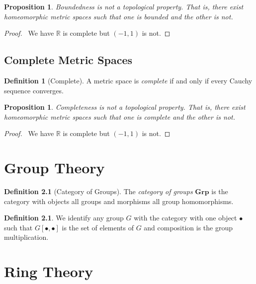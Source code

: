 \documentclass{book}
\let\qed\relax
\newtheorem{proposition}[lemma]{Proposition}
\theoremstyle{definition}
\newtheorem{definition}[lemma]{Definition}
\newcommand{\Real}{\ensuremath{\mathbb{R}}}
\begin{document}
\begin{proposition}
    Boundedness is not a topological property. That is, there exist homeomorphic metric spaces such that one is bounded and the other is
    not.
\end{proposition}

\begin{proof}
    \pf\ We have $\Real$ is complete but $(-1,1)$ is not. \qed
\end{proof}

\section{Complete Metric Spaces}

\begin{definition}[Complete]
    A metric space is \emph{complete} if and only if every Cauchy sequence converges.
\end{definition}

\begin{proposition}
    Completeness is not a topological property. That is, there exist homeomorphic metric spaces such that one is complete and the other is
    not.
\end{proposition}

\begin{proof}
    \pf\ We have $\Real$ is complete but $(-1,1)$ is not. \qed
\end{proof}

\chapter{Group Theory}

\begin{definition}[Category of Groups]
    The \emph{category of groups} $\mathbf{Grp}$ is the category with objects all groups and morphisms all group homomorphisms.
\end{definition}

\begin{definition}
    We identify any group $G$ with the category with one object $\bullet$ such that $G[\bullet,\bullet]$ is the set of elements
    of $G$ and composition is the group multiplication.
\end{definition}

\chapter{Ring Theory}
\end{document}
